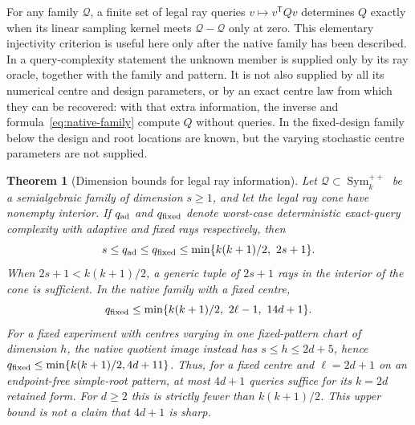 \documentclass[11pt,reqno]{amsart}
\numberwithin{equation}{section}
\newtheorem{theorem}{Theorem}[section]
\theoremstyle{definition}
\theoremstyle{remark}
\newcommand{\Sym}{\operatorname{Sym}}
\newcommand{\cQ}{\mathscr Q}
\begin{document}
For any family $\cQ$, a finite set of legal ray queries $v\mapsto v^{\mathsf T}Qv$ determines $Q$ exactly when its linear sampling kernel meets $\cQ-\cQ$ only at zero. This elementary injectivity criterion is useful here only after the native family has been described. In a query-complexity statement the unknown member is supplied only by its ray oracle, together with the family and pattern. It is not also supplied by all its numerical centre and design parameters, or by an exact centre law from which they can be recovered: with that extra information, the inverse and formula~\eqref{eq:native-family} compute $Q$ without queries. In the fixed-design family below the design and root locations are known, but the varying stochastic centre parameters are not supplied.

\begin{theorem}[Dimension bounds for legal ray information]\label{thm:dimension-queries}
Let $\cQ\subset\Sym_k^{++}$ be a semialgebraic family of dimension $s\ge1$, and let the legal ray cone have nonempty interior. If $q_{\rm ad}$ and $q_{\rm fixed}$ denote worst-case deterministic exact-query complexity with adaptive and fixed rays respectively, then
\begin{equation}\label{eq:dimension-queries}
 s\le q_{\rm ad}\le q_{\rm fixed}
       \le\min\{k(k+1)/2,\ 2s+1\}.
\end{equation}
When $2s+1<k(k+1)/2$, a generic tuple of $2s+1$ rays in the interior of the cone is sufficient. In the native family with a fixed centre,
\[
 q_{\rm fixed}\le\min\{k(k+1)/2,\ 2\ell-1,\ 14d+1\}.
\]
For a fixed experiment with centres varying in one fixed-pattern chart of dimension $h$, the native quotient image instead has $s\le h\le2d+5$, hence $q_{\rm fixed}\le\min\{k(k+1)/2,4d+11\}$. Thus, for a fixed centre and $\ell=2d+1$ on an endpoint-free simple-root pattern, at most $4d+1$ queries suffice for its $k=2d$ retained form. For $d\ge2$ this is strictly fewer than $k(k+1)/2$. This upper bound is not a claim that $4d+1$ is sharp.
\end{theorem}
\end{document}
